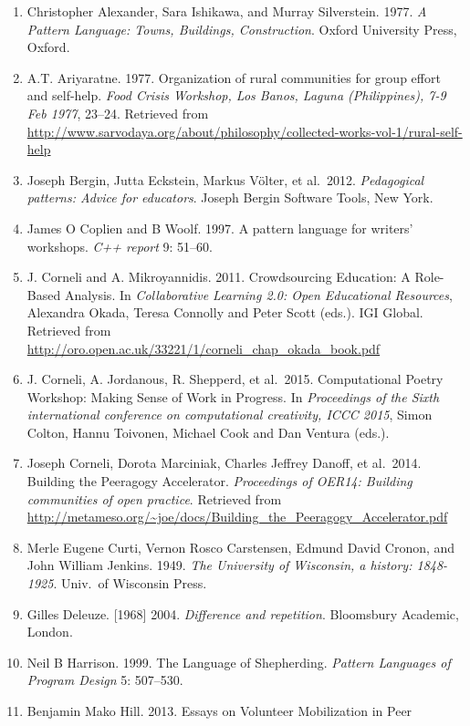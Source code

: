 \begin{enumerate}
\def\labelenumi{\arabic{enumi}.}
\item
  Christopher Alexander, Sara Ishikawa, and Murray Silverstein. 1977.
  \emph{A Pattern Language: Towns, Buildings, Construction}. Oxford
  University Press, Oxford.
\item
  A.T. Ariyaratne. 1977. Organization of rural communities for group
  effort and self-help. \emph{Food Crisis Workshop, Los Banos, Laguna
  (Philippines), 7-9 Feb 1977}, 23--24. Retrieved from
  \url{http://www.sarvodaya.org/about/philosophy/collected-works-vol-1/rural-self-help}
\item
  Joseph Bergin, Jutta Eckstein, Markus Völter, et al.~2012.
  \emph{Pedagogical patterns: Advice for educators}. Joseph Bergin
  Software Tools, New York.
\item
  James O Coplien and B Woolf. 1997. A pattern language for writers'
  workshops. \emph{C++ report} 9: 51--60.
\item
  J. Corneli and A. Mikroyannidis. 2011. Crowdsourcing Education: A
  Role-Based Analysis. In \emph{Collaborative Learning 2.0: Open
  Educational Resources}, Alexandra Okada, Teresa Connolly and Peter
  Scott (eds.). IGI Global. Retrieved from
  \url{http://oro.open.ac.uk/33221/1/corneli_chap_okada_book.pdf}
\item
  J. Corneli, A. Jordanous, R. Shepperd, et al.~2015. Computational
  Poetry Workshop: Making Sense of Work in Progress. In
  \emph{Proceedings of the Sixth international conference on
  computational creativity, ICCC 2015}, Simon Colton, Hannu Toivonen,
  Michael Cook and Dan Ventura (eds.).
\item
  Joseph Corneli, Dorota Marciniak, Charles Jeffrey Danoff, et al.~2014.
  Building the Peeragogy Accelerator. \emph{Proceedings of OER14:
  Building communities of open practice}. Retrieved from
  \url{http://metameso.org/~joe/docs/Building_the_Peeragogy_Accelerator.pdf}
\item
  Merle Eugene Curti, Vernon Rosco Carstensen, Edmund David Cronon, and
  John William Jenkins. 1949. \emph{The University of Wisconsin, a
  history: 1848-1925}. Univ.~of Wisconsin Press.
\item
  Gilles Deleuze. {[}1968{]} 2004. \emph{Difference and repetition}.
  Bloomsbury Academic, London.
\item
  Neil B Harrison. 1999. The Language of Shepherding. \emph{Pattern
  Languages of Program Design} 5: 507--530.
\item
  Benjamin Mako Hill. 2013. Essays on Volunteer Mobilization in Peer

\end{enumerate}
